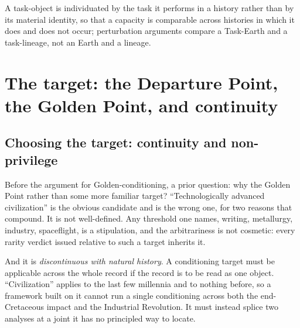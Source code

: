\begin{definition}
\label{imp:taskobject}
A task-object is individuated by the task it performs in a history rather
than by its material identity, so that a capacity is comparable across
histories in which it does and does not occur; perturbation arguments
compare a Task-Earth and a task-lineage, not an Earth and a lineage.
\end{definition}

\section{The target: the Departure Point, the Golden Point, and continuity}\label{sec:target}

\subsection{Choosing the target: continuity and non-privilege}\label{gc:sub:continuity}

Before the argument for Golden-conditioning, a prior question: why the
Golden Point rather than some more familiar target? ``Technologically
advanced civilization'' is the obvious candidate and is the wrong one,
for two reasons that compound. It is not well-defined. Any threshold one names, writing, metallurgy,
industry, spaceflight, is a stipulation, and the arbitrariness is not
cosmetic: every rarity verdict issued relative to such a target inherits
it.

And it is \emph{discontinuous with natural history}. A conditioning
target must be applicable across the whole record if the record is to be
read as one object. ``Civilization'' applies to the last few millennia
and to nothing before, so a framework built on it cannot run a single
conditioning across both the end-Cretaceous impact and the Industrial
Revolution. It must instead splice two analyses at a joint it has no
principled way to locate.

